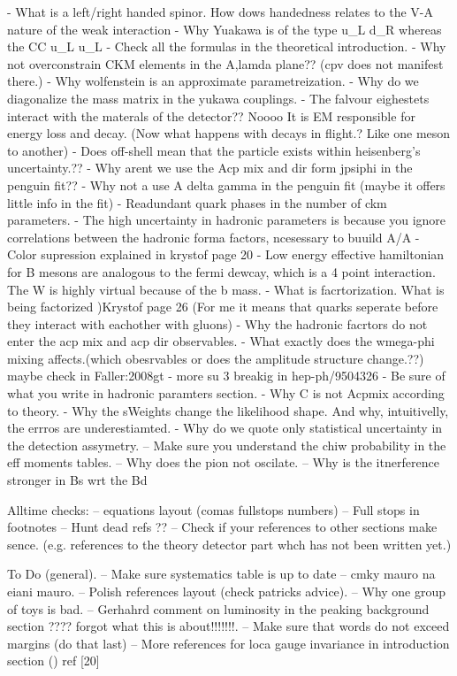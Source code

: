 - What is a left/right handed spinor. How dows handedness relates to the V-A nature of the weak interaction
- Why Yuakawa is of the type u_L d_R whereas the CC u_L u_L
- Check all the formulas in the theoretical introduction.
- Why not overconstrain CKM elements in the A,lamda plane?? (cpv does not manifest there.)
- Why wolfenstein is an approximate parametreization.
- Why do we diagonalize the mass matrix in the yukawa couplings.
- The falvour eighestets interact with the materals of the detector?? Noooo
  It is EM responsible for energy loss and decay. (Now what happens with decays in flight.? Like one meson to another)
- Does off-shell mean that the particle exists within heisenberg's uncertainty.??
- Why arent we use the Acp mix and dir form jpsiphi in the penguin fit??
- Why not a use A delta gamma in the penguin fit (maybe it offers little info in the fit)
- Readundant quark phases in the number of ckm parameters.
- The high uncertainty in hadronic parameters is because you ignore correlations between the hadronic forma factors, ncesessary to buuild A/A
- Color supression  explained in krystof page 20
- Low energy effective hamiltonian for B mesons are analogous to the fermi dewcay, which is a 4 point interaction. The W is highly virtual because of the b mass.
- What is facrtorization. What is being factorized )Krystof page 26 (For me it means that quarks seperate before they interact with eachother with gluons)
- Why the hadronic facrtors do not enter the acp mix and acp dir observables.
- What exactly does the wmega-phi mixing affects.(which obesrvables or does the amplitude structure change.??)  maybe check in  {Faller:2008gt}
- more su 3 breakig in hep-ph/9504326
- Be sure of what you write in hadronic paramters section.
- Why C is not Acpmix according to theory.
- Why the sWeights change the likelihood shape. And why, intuitivelly, the errros are underestiamted.
- Why do we quote only statistical uncertainty in the detection assymetry.
-- Make sure you understand the chiw probability in the eff moments tables.
-- Why does the pion not oscilate.
-- Why is the itnerference stronger in Bs wrt the Bd

Alltime checks:
-- equations layout (comas fullstops numbers)
-- Full stops in footnotes
-- Hunt dead refs ??
-- Check if your references to other sections make sence. (e.g. references to the theory detector part whch has not been written yet.)

To Do (general).
-- Make sure systematics table is up to date
-- cmky mauro na eiani mauro.
-- Polish references layout (check patricks advice).
-- Why one group of toys is bad.
-- Gerhahrd comment on luminosity in the peaking background section ???? forgot what this is about!!!!!!!.
-- Make sure that words do not exceed margins (do that last)
-- More references for loca gauge invariance in introduction section () ref [20]

